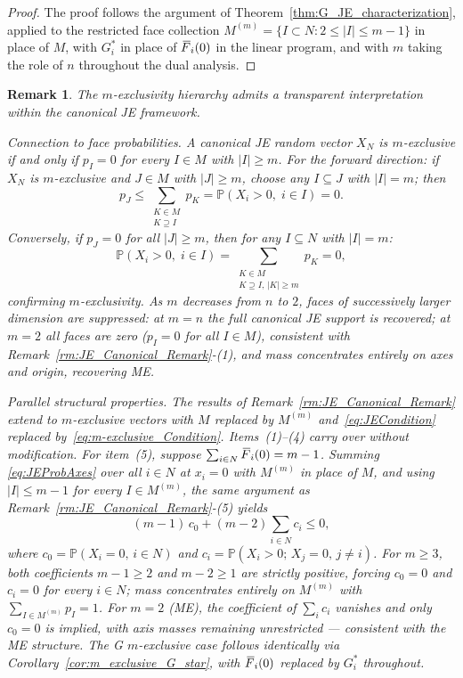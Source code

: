\documentclass[letterpaper,12pt]{article}
\def \P {\mathbb{P}}
\numberwithin{equation}{section}
\newtheorem{remark}[theorem]{Remark}
\newcommand{\N}{{N}}
\newcommand{\M}{{M}}
\newcommand{\J}{{J}}
\newcommand{\K}{{K}}
\newcommand{\I}{{I}}
\newcommand{\F}{\,\overline{\kern-0.175em F\kern-0em}}
\begin{document}
{\begin{proof}
The proof follows the argument of Theorem~\ref{thm:G_JE_characterization},
applied to the restricted face collection $\M^{(m)}=\{I\subset\N:2\le|I|\le m-1\}$
in place of $\M$, with $G_i^*$ in place of $\F_i(0)$ in the linear program, and
with $m$ taking the role of $n$ throughout the dual analysis.
\end{proof}
\begin{remark}
\label{rm:m_exclusive_canonical}
The $m$-exclusivity hierarchy admits a transparent interpretation within the
canonical JE framework.

\textit{Connection to face probabilities.}
A canonical JE random vector $X_\N$ is $m$-exclusive if and only if $p_\I=0$
for every $\I\in\M$ with $|\I|\ge m$. For the forward direction: if $X_\N$ is
$m$-exclusive and $\J\in\M$ with $|\J|\ge m$, choose any $I\subseteq\J$ with
$|I|=m$; then
\[
p_\J\le\sum_{\substack{\K\in\M\\\K\supseteq I}}p_\K
=\P(X_i>0,\;i\in I)=0.
\]
Conversely, if $p_\J=0$ for all $|\J|\ge m$, then for any $I\subseteq\N$ with
$|I|=m$:
\[
\P(X_i>0,\;i\in I)
=\sum_{\substack{\K\in\M\\\K\supseteq I,\,|\K|\ge m}}p_\K=0,
\]
confirming $m$-exclusivity. As $m$ decreases from $n$ to $2$, faces of
successively larger dimension are suppressed: at $m=n$ the full canonical JE
support is recovered; at $m=2$ all faces are zero ($p_\I=0$ for all $\I\in\M$),
consistent with Remark~\ref{rm:JE_Canonical_Remark}-(1), and mass concentrates
entirely on axes and origin, recovering ME.

\textit{Parallel structural properties.}
The results of Remark~\ref{rm:JE_Canonical_Remark} extend to $m$-exclusive
vectors with $\M$ replaced by $\M^{(m)}$ and~\eqref{eq:JECondition} replaced
by~\eqref{eq:m-exclusive_Condition}. Items~(1)--(4) carry over without
modification. For item~(5), suppose $\sum_{i\in\N}\F_i(0)=m-1$. Summing
\eqref{eq:JEProbAxes} over all $i\in\N$ at $x_i=0$ with $\M^{(m)}$ in place
of $\M$, and using $|\I|\le m-1$ for every $\I\in\M^{(m)}$, the same argument
as Remark~\ref{rm:JE_Canonical_Remark}-(5) yields
\[
(m-1)\,c_0+(m-2)\sum_{i\in\N}c_i\le 0,
\]
where $c_0=\P(X_i=0,\,i\in\N)$ and $c_i=\P(X_i>0;\,X_j=0,\,j\ne i)$. For
$m\ge3$, both coefficients $m-1\ge2$ and $m-2\ge1$ are strictly positive,
forcing $c_0=0$ and $c_i=0$ for every $i\in\N$; mass concentrates entirely
on $\M^{(m)}$ with $\sum_{\I\in\M^{(m)}}p_\I=1$. For $m=2$ (ME), the
coefficient of $\sum_i c_i$ vanishes and only $c_0=0$ is implied, with axis
masses remaining unrestricted — consistent with the ME structure. The G
$m$-exclusive case follows identically via Corollary~\ref{cor:m_exclusive_G_star},
with $\F_i(0)$ replaced by $G_i^*$ throughout.


\end{remark}}
\end{document}
